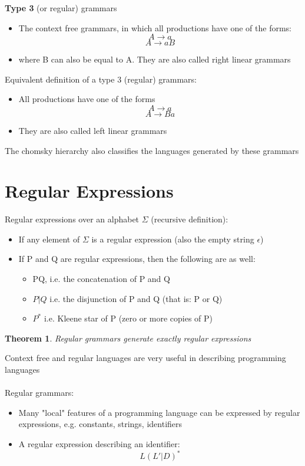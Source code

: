 \documentclass{article}[18pt]
\newtheorem{theorem}{Theorem}
\begin{document}
\textbf{Type 3} (or regular) grammars
\begin{itemize}
	\item The context free grammars, in which all productions have one of the forms:
$$A\rightarrow a$$
$$A\rightarrow aB$$
	\item where B can also be equal to A. They are also called right linear grammars
\end{itemize}
Equivalent definition of a type 3 (regular) grammars:
\begin{itemize}
	\item All productions have one of the forms
	$$A\rightarrow a$$
	$$A\rightarrow Ba$$
	\item They are also called left linear grammars
\end{itemize}
The chomsky hierarchy also classifies the languages generated by these grammars
\section{Regular Expressions}
Regular expressions over an alphabet $\Sigma$ (recursive definition):
\begin{itemize}
	\item If any element of $\Sigma$ is a regular expression (also the empty string $\epsilon$)
	\item If P and Q are regular expressions, then the following are as well:
	\begin{itemize}
		\item PQ, i.e. the concatenation of P and Q
		\item $P|Q$ i.e. the disjunction of P and Q (that is: P or Q)
		\item $P^*$ i.e. Kleene star of P (zero or more copies of P)
	\end{itemize}
\end{itemize}
\begin{theorem}
	Regular grammars generate exactly regular expressions
\end{theorem}
Context free and regular languages are very useful in describing programming languages\\
\\
Regular grammars:
\begin{itemize}
	\item Many "local" features of a programming language can be expressed by regular expressions, e.g. constants, strings, identifiers
	\item A regular expression describing an identifier:
	$$L(L'|D)^*$$
\end{itemize}
\end{document}
